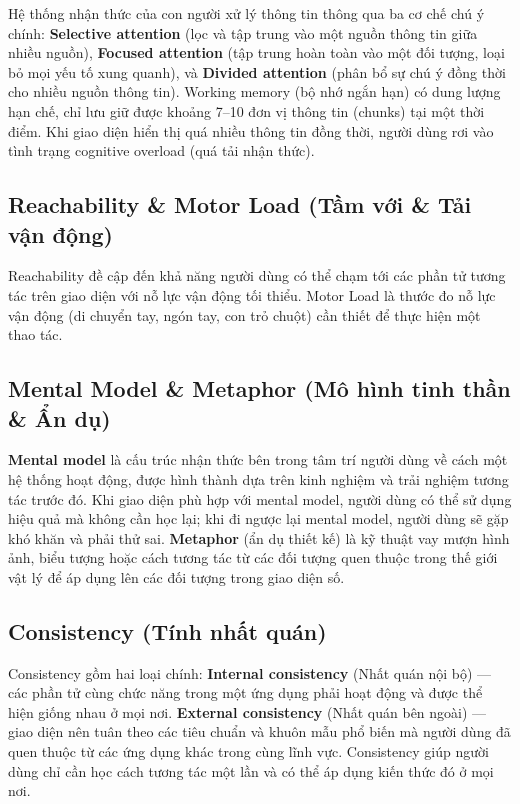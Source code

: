 Hệ thống nhận thức của con người xử lý thông tin thông qua ba cơ chế chú ý chính: \textbf{Selective attention} (lọc và tập trung vào một nguồn thông tin giữa nhiều nguồn), \textbf{Focused attention} (tập trung hoàn toàn vào một đối tượng, loại bỏ mọi yếu tố xung quanh), và \textbf{Divided attention} (phân bổ sự chú ý đồng thời cho nhiều nguồn thông tin). Working memory (bộ nhớ ngắn hạn) có dung lượng hạn chế, chỉ lưu giữ được khoảng 7--10 đơn vị thông tin (chunks) tại một thời điểm. Khi giao diện hiển thị quá nhiều thông tin đồng thời, người dùng rơi vào tình trạng cognitive overload (quá tải nhận thức).

\subsection{Reachability \& Motor Load (Tầm với \& Tải vận động)}

Reachability đề cập đến khả năng người dùng có thể chạm tới các phần tử tương tác trên giao diện với nỗ lực vận động tối thiểu. Motor Load là thước đo nỗ lực vận động (di chuyển tay, ngón tay, con trỏ chuột) cần thiết để thực hiện một thao tác.

\subsection{Mental Model \& Metaphor (Mô hình tinh thần \& Ẩn dụ)}

\textbf{Mental model} là cấu trúc nhận thức bên trong tâm trí người dùng về cách một hệ thống hoạt động, được hình thành dựa trên kinh nghiệm và trải nghiệm tương tác trước đó. Khi giao diện phù hợp với mental model, người dùng có thể sử dụng hiệu quả mà không cần học lại; khi đi ngược lại mental model, người dùng sẽ gặp khó khăn và phải thử sai. \textbf{Metaphor} (ẩn dụ thiết kế) là kỹ thuật vay mượn hình ảnh, biểu tượng hoặc cách tương tác từ các đối tượng quen thuộc trong thế giới vật lý để áp dụng lên các đối tượng trong giao diện số.

\subsection{Consistency (Tính nhất quán)}

Consistency gồm hai loại chính: \textbf{Internal consistency} (Nhất quán nội bộ) --- các phần tử cùng chức năng trong một ứng dụng phải hoạt động và được thể hiện giống nhau ở mọi nơi. \textbf{External consistency} (Nhất quán bên ngoài) --- giao diện nên tuân theo các tiêu chuẩn và khuôn mẫu phổ biến mà người dùng đã quen thuộc từ các ứng dụng khác trong cùng lĩnh vực. Consistency giúp người dùng chỉ cần học cách tương tác một lần và có thể áp dụng kiến thức đó ở mọi nơi.

